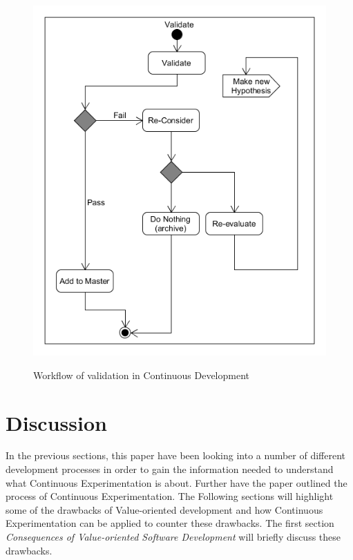 \documentclass{sig-alternate}
\begin{document}
\begin{figure}
\centering
\caption{Workflow of validation in Continuous Development}
\includegraphics[scale=0.4]{Umlet/ValidateActivity}
\label{fig:validation}
\end{figure}

\section{Discussion}
In the previous sections, this paper have been looking into a number of different development processes in order to gain the information needed to understand what Continuous Experimentation is about. Further have the paper outlined the process of Continuous Experimentation. The Following sections will highlight some of the drawbacks of Value-oriented development and how Continuous Experimentation can be applied to counter these drawbacks. The first section \textit{Consequences of Value-oriented Software Development} will briefly discuss these drawbacks. 
\end{document}
